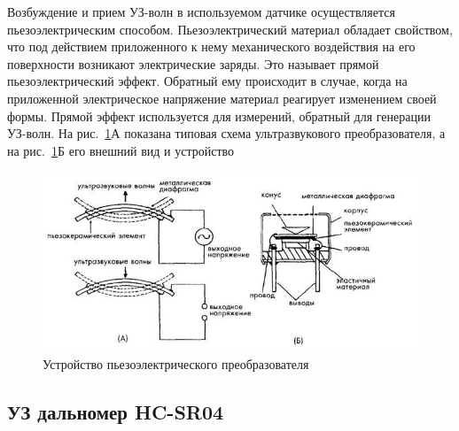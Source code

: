 \documentclass[12pt]{article}
\begin{document}
Возбуждение и прием УЗ-волн в используемом датчике осуществляется пьезоэлектрическим способом. Пьезоэлектрический материал обладает свойством, что под действием приложенного к нему механического воздействия на его поверхности возникают электрические заряды. Это называет прямой пьезоэлектрический эффект. Обратный ему происходит в случае, когда на приложенной электрическое напряжение материал реагирует изменением своей формы. Прямой эффект используется для измерений, обратный для генерации УЗ-волн. На рис.~\ref{fig:screenshot002}А показана типовая схема ультразвукового преобразователя, а на рис.~\ref{fig:screenshot002}Б его внешний вид и устройство

\begin{figure}[H]
	\centering
	\includegraphics[width=0.7\linewidth]{images/screenshot002}
	\caption{Устройство пьезоэлектрического преобразователя}
	\label{fig:screenshot002}
\end{figure}


\subsection{УЗ дальномер HC-SR04}
\end{document}
